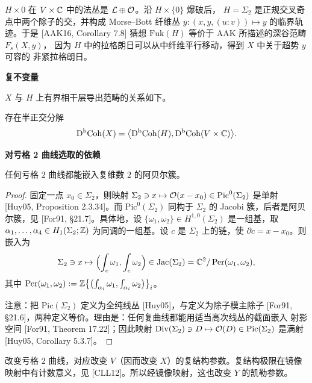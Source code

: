 \begin{proposition}\label{prop:morse-bott}
$H\times0$ 在 $V\times\mathbb{C}$ 中的法丛是 $\mathcal{L}\oplus\mathcal{O}$。沿 $H\times\{0\}$ 爆破后，
$H=\Sigma_2$ 是正规交叉奇点中两个除子的交，并构成 Morse--Bott 纤维丛
$y\colon(x,y,(u:v))\mapsto y$ 的临界轨迹。于是 [AAK16, Corollary 7.8] 猜想
$\mathrm{Fuk}(H)$ 等价于 AAK 所描述的深谷范畴 $F_s(X,y)$，
因为 $H$ 中的拉格朗日可以从中纤维平行移动，得到 $X$ 中关于超势 $y$ 可容的
非紧拉格朗日。
\end{proposition}


\medskip\noindent\textbf{复不变量}\par

$X$ 与 $H$ 上有界相干层导出范畴的关系如下。

\begin{lemma}[{Orlov [APS]}]\label{lem:orlov}
存在半正交分解
\[
\mathrm{D}^{\mathrm{b}}\mathrm{Coh}(X)=\bigl\langle\mathrm{D}^{\mathrm{b}}\mathrm{Coh}(H),\mathrm{D}^{\mathrm{b}}\mathrm{Coh}(V\times\mathbb{C})\bigr\rangle.
\]
\end{lemma}


\medskip\noindent\textbf{对亏格 2 曲线选取的依赖}\par

\begin{claim}\label{claim:embed-genus2}
任何亏格 $2$ 曲线都能嵌入复维数 $2$ 的阿贝尔簇。
\end{claim}

\begin{proof}
固定一点 $x_0\in\Sigma_2$，则映射
$\Sigma_2\ni x\mapsto\mathcal{O}(x-x_0)\in\mathrm{Pic}^0(\Sigma_2)$ 是单射
[Huy05, Proposition 2.3.34]。而 $\mathrm{Pic}^0(\Sigma_2)$ 同构于 $\Sigma_2$ 的
Jacobi 簇，后者是阿贝尔簇，见 [For91, §21.7]。具体地，设
$\{\omega_1,\omega_2\}\in H^{1,0}(\Sigma_2)$ 是一组基，取
$\alpha_1,\dots,\alpha_4\in H_1(\Sigma_2;\mathbb{Z})$ 为同调的一组基。设 $c$ 是 $\Sigma_2$
上的链，使 $\partial c=x-x_0$。则嵌入为
\[
\Sigma_2\ni x\mapsto\Bigl(\int_c\omega_1,\int_c\omega_2\Bigr)
\in\operatorname{Jac}(\Sigma_2)=\mathbb{C}^2/\operatorname{Per}(\omega_1,\omega_2),
\]
其中
$\operatorname{Per}(\omega_1,\omega_2)
:=\mathbb{Z}\bigl\{\bigl(\int_{\alpha_i}\omega_1,\int_{\alpha_i}\omega_2\bigr)\bigr\}_i$。

注意：把 $\mathrm{Pic}(\Sigma_2)$ 定义为全纯线丛 [Huy05]，与定义为除子模主除子
[For91, §21.6]，两种定义等价。理由是：任何复曲线都能用适当高次线丛的截面嵌入
射影空间 [For91, Theorem 17.22]；因此映射
$\mathrm{Div}(\Sigma_2)\ni D\mapsto\mathcal{O}(D)\in\mathrm{Pic}(\Sigma_2)$ 是满射
[Huy05, Corollary 5.3.7]。
\end{proof}

\begin{corollary}\label{cor:vary-genus2}
改变亏格 $2$ 曲线，对应改变 $V$（因而改变 $X$）的复结构参数。复结构极限在镜像
映射中有计数意义，见 [CLL12]。所以经镜像映射，这也改变 $Y$ 的凯勒参数。
\end{corollary}
